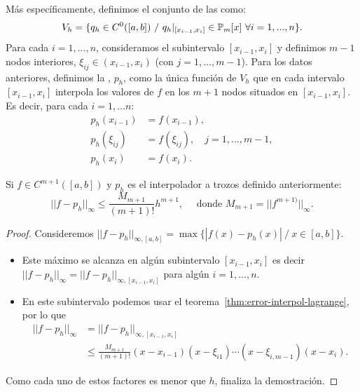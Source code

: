 Más específicamente, definimos el conjunto de las  como:
\begin{equation*}
  V_h = \{ q_h\in C^0([a,b]) \ /\ q_h|_{[x_{i-1},x_{i}]}\in \Pol_m[x]\
  \forall i=1,...,n \}.
\end{equation*}
Para cada $i=1,...,n$, consideramos el subintervalo $[x_{i-1},x_i]$ y
definimos $m-1$ nodos interiores, $\xi_{ij}\in (x_{i-1},x_i)$ (con
$j=1,\dots,m-1$). Para los datos anteriores, definimos la
, $p_h$, como
la única función de $V_h$ que en cada intervalo $[x_{i-1},x_i]$
interpola los valores de $f$ en los $m+1$ nodos situados en $[x_{i-1},
x_{i}]$.  Es decir, para cada $i=1,\dots n$:
\begin{align*}
  p_h(x_{i-1})&=f(x_{i-1}),\\
  p_h(\xi_{ij})&=f(\xi_{ij}), \quad j=1,...,m-1,\\
  p_h(x_i)&=f(x_i).
\end{align*}

\begin{theorem}
  \label{thm:interpol-trozos-error}
  Si $f\in C^{m+1}( [a,b])$ y $p_h$ es el interpolador a trozos
  definido anteriormente:
  \begin{equation}
    ||f-p_h||_\infty\le\frac{M_{m+1}}{(m+1)!}h^{m+1},
    \quad
    \text{ donde } M_{m+1}=||f^{m+1)}||_\infty.
    \label{eq:interpol-trozos-error}
  \end{equation}
\end{theorem}

\begin{proof}
  Consideremos $||f-p_h||_{\infty, [a,b]}=\max\{ |f(x)-p_h(x)|\ /\
  x\in[a,b]\}$.
  \begin{itemize}
  \item Este máximo se alcanza en algún subintervalo $[x_{i-1},x_{i}]$
    es decir $||f-p_h||_{\infty}=||f-p_h||_{\infty, [x_{i-1},x_i]}$
    para algún $i=1,\dots,n$.
  \item En este subintervalo podemos usar el
    teorema~\ref{thm:error-interpol-lagrange}, por lo que
    \begin{align*}
      ||f-p_h||_\infty &= ||f-p_h||_{\infty, [x_{i-1},x_i]}  \\
                       &\le\frac{M_{m+1}}{(m+1)!}
                         (x-x_{i-1})(x-\xi_{i1})\cdots(x-\xi_{i,m-1})(x-x_i).
    \end{align*}
  \end{itemize}
  Como cada uno de estos factores es menor que $h$, finaliza la
  demostración.
\end{proof}

